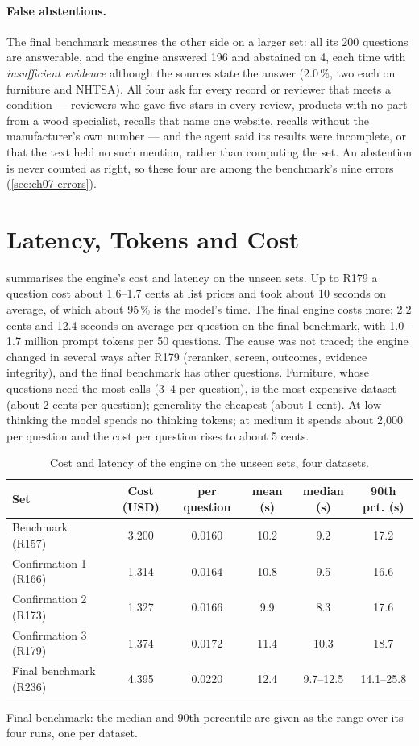 \paragraph{False abstentions.} The final benchmark measures the other side on a larger set: all its 200 questions are
answerable, and the engine answered 196 and abstained on 4, each time with \emph{insufficient evidence} although the
sources state the answer (2.0\,\%, two each on furniture and NHTSA). All four ask for every record or reviewer that
meets a condition --- reviewers who gave five stars in every review, products with no part from a wood specialist,
recalls that name one website, recalls without the manufacturer's own number --- and the agent said its results were
incomplete, or that the text held no such mention, rather than computing the set. An abstention is never counted as right, so these four are among the
benchmark's nine errors (\cref{sec:ch07-errors}).

\section{Latency, Tokens and Cost}\label{sec:ch07-cost}

 summarises the engine's cost and latency on the unseen sets. Up to R179 a question cost about 1.6--1.7
cents at list prices and took about 10 seconds on average, of which about 95\,\% is the model's time. The final engine
costs more: 2.2 cents and 12.4 seconds on average per question on the final benchmark, with 1.0--1.7 million prompt
tokens per 50 questions. The cause was not traced; the engine changed in several ways after R179 (reranker, screen,
outcomes, evidence integrity), and the final benchmark has other questions. Furniture, whose
questions need the most calls (3--4 per question), is the most expensive dataset (about 2 cents per question);
generality the cheapest (about 1 cent). At low thinking the model spends no thinking tokens; at medium it spends about
2{,}000 per question and the cost per question rises to about 5 cents.

\begin{table}[htbp]
\centering
\caption{Cost and latency of the engine on the unseen sets, four datasets.}
\label{tab:cost}
\small
\begin{tabular}{@{}lccccc@{}}
\toprule
Set & Cost (USD) & per question & mean (s) & median (s) & 90th pct. (s) \\
\midrule
Benchmark (R157) & 3.200 & 0.0160 & 10.2 & 9.2 & 17.2 \\
Confirmation 1 (R166) & 1.314 & 0.0164 & 10.8 & 9.5 & 16.6 \\
Confirmation 2 (R173) & 1.327 & 0.0166 & 9.9 & 8.3 & 17.6 \\
Confirmation 3 (R179) & 1.374 & 0.0172 & 11.4 & 10.3 & 18.7 \\
\midrule
Final benchmark (R236) & 4.395 & 0.0220 & 12.4 & 9.7--12.5 & 14.1--25.8 \\
\bottomrule
\end{tabular}

\smallskip
{\footnotesize Final benchmark: the median and 90th percentile are given as the range over its four runs, one per
dataset.}
\end{table}

